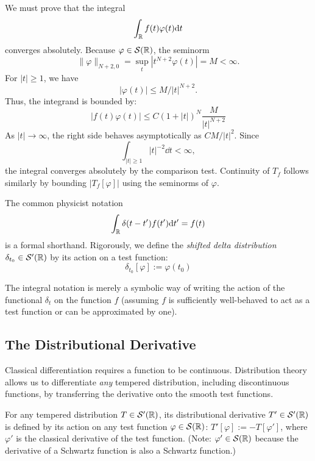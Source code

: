 \begin{remark}
We must prove that the integral \[
\int_{\mathbb{R}} f(t) \varphi(t) \mathrm{d} t
\] converges absolutely. Because $\varphi \in \mathcal{S}(\mathbb{R})$, the seminorm
\[
\|\varphi\|_{N+2, 0} = \sup_t |t^{N+2}\varphi(t)| = M < \infty.
\]
For $|t| \geq 1$, we have
\[
|\varphi(t)| \leq M / |t|^{N+2}.
\]
Thus, the integrand is bounded by:
\begin{equation}
|f(t) \varphi(t)| \leq C(1 + |t|)^N \frac{M}{|t|^{N+2}}
\end{equation}
As $|t| \to \infty$, the right side behaves asymptotically as $CM / |t|^2$. Since \[
\int_{|t| \geq 1} |t|^{-2} \dd t < \infty,
\] the integral converges absolutely by the comparison test. Continuity of $T_f$ follows similarly by bounding $|T_f[\varphi]|$ using the seminorms of $\varphi$.
\end{remark}

\begin{remark}
The common physicist notation \[
\int_{\mathbb{R}} \delta(t-t') f(t') \mathrm{d} t' = f(t)
\] is a formal shorthand. Rigorously, we define the \textit{shifted delta distribution} $\delta_{t_0} \in \mathcal{S}'(\mathbb{R})$ by its action on a test function:
\begin{equation}
\delta_{t_0}[\varphi] := \varphi(t_0)
\end{equation}

The integral notation is merely a symbolic way of writing the action of the functional $\delta_t$ on the function $f$ (assuming $f$ is sufficiently well-behaved to act as a test function or can be approximated by one).
\end{remark}



\subsection{The Distributional Derivative}

Classical differentiation requires a function to be continuous. Distribution theory allows us to differentiate \textit{any} tempered distribution, including discontinuous functions, by transferring the derivative onto the smooth test functions.

\begin{definition}
For any tempered distribution $T \in \mathcal{S}'(\mathbb{R})$, its distributional derivative $T' \in \mathcal{S}'(\mathbb{R})$ is defined by its action on any test function $\varphi \in \mathcal{S}(\mathbb{R})$: $T'[\varphi] := -T[\varphi']$, where $\varphi'$ is the classical derivative of the test function. (Note: $\varphi' \in \mathcal{S}(\mathbb{R})$ because the derivative of a Schwartz function is also a Schwartz function.)
\end{definition}

